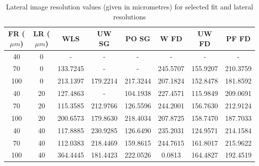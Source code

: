\begin{table}[h]
	\begin{center}
		\begin{tabular}{|c||c||c|c|c|c|c|c|}
			\hline 
			FR ($\mu m$) & LR ($\mu m$) & WLS & UW SG & PO SG & W FD & UW FD & PF FD \\
			\hline
			\hline
			40 & 0 & - & - & - & - & - & - \\
			\hline
			70 & 0 & 133.7245 & - & - & 245.5707 & 155.9207 & 210.3759 \\
			\hline
			100 & 0 & 213.1397 & 179.2214 & 217.3244 & 207.1824 & 152.8478 & 181.8592 \\
			\hline
			40 & 20 & 127.4863 & - & 104.1938 & 227.4571 & 115.9849 & 209.0691 \\
			\hline
			70 & 20 & 115.3585 & 212.9766 & 126.5596 & 244.2001 & 156.7630 &  212.9124 \\
			\hline
			100 & 20 & 200.6573 & 179.8630 & 218.4034 & 207.8725 & 158.7470 & 187.7033 \\
			\hline
			40 & 40 & 117.8885 &  230.9285 & 126.6490 & 235.2031 & 124.9571 & 214.1584 \\
			\hline
			70 & 40 & 112.0383 & 218.4469 & 159.8615 & 244.7615 & 161.8017 & 215.9622 \\
			\hline
			100 & 40 & 364.4445 & 181.4423 & 222.0526 & 0.0813 & 164.4827 & 192.4519 \\
			\hline
		\end{tabular}
	\end{center}
	\caption{Lateral image resolution values (given in micrometres) for selected fit and lateral resolutions}
	\label{lateral_imageres_table}
\end{table}

